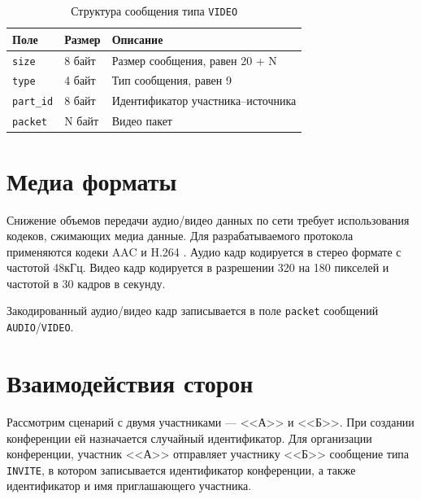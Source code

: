 \begin{table}[H]
  \centering
  \caption{Структура сообщения типа \texttt{VIDEO}}
  \label{tbl:msg:video}
  \begin{tabular}{|l|l|l|}
    \hline
    \textbf{Поле} & \textbf{Размер} & \textbf{Описание} \\ \hline
    \texttt{size} & 8 байт & Размер сообщения, равен 20 + N \\ \hline
    \texttt{type} & 4 байт & Тип сообщения, равен 9 \\ \hline
    \texttt{part\_id} & 8 байт & Идентификатор участника--источника \\ \hline
    \texttt{packet} & N байт & Видео пакет \\ \hline
  \end{tabular}
\end{table}

\section{Медиа форматы}

Снижение объемов передачи аудио/видео данных по сети требует использования кодеков, сжимающих медиа данные. Для разрабатываемого протокола применяются кодеки AAC \cite{aac} и H.264 \cite{h264}. Аудио кадр кодируется в стерео формате с частотой 48кГц. Видео кадр кодируется в разрешении 320 на 180 пикселей и частотой в 30 кадров в секунду.

Закодированный аудио/видео кадр записывается в поле \texttt{packet} сообщений \texttt{AUDIO}/\texttt{VIDEO}.

\section{Взаимодействия сторон}

Рассмотрим сценарий с двумя участниками --- <<А>> и <<Б>>.
При создании конференции ей назначается случайный идентификатор. Для организации конференции, участник <<А>> отправляет участнику <<Б>> сообщение типа \texttt{INVITE}, в котором записывается идентификатор конференции, а также идентификатор и имя приглашающего участника.

